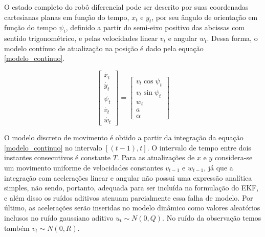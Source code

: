 \documentclass[a4paper,11pt]{article}
\begin{document}
O estado completo do robô diferencial pode ser descrito por suas coordenadas cartesianas planas em função do tempo, $x_t$ e $y_t$, por seu ângulo de orientação em função do tempo $\psi_t$, definido a partir do semi-eixo positivo das abcissas com sentido trigonométrico, e pelas velocidades linear $v_t$ e angular $w_t$. Dessa forma, o modelo contínuo de atualização na posição é dado pela equação \eqref{modelo_continuo}.

\begin{equation}
    \label{modelo_continuo}
    \begin{bmatrix} \dot{x_t} \\ \dot{y_t} \\ \dot{\psi_t} \\ \dot{v_t} \\ \dot{w_t}
    \end{bmatrix}
    =
    \begin{bmatrix} v_t \cos{\psi_t} \\ v_t \sin{\psi_t} \\ w_t \\ a \\ \alpha
    \end{bmatrix}
\end{equation}

O modelo discreto de movimento é obtido a partir da integração da equação \eqref{modelo_continuo} no intervalo $[(t-1),t]$. O intervalo de tempo entre dois instantes consecutivos é constante $T$. Para as atualizações de $x$ e $y$ considera-se um movimento uniforme de velocidades constantes $v_{t-1}$ e $w_{t-1}$, já que a integração com acelerações linear e angular não possui uma expressão analítica simples, não sendo, portanto, adequada para ser incluída na formulação do EKF, e além disso os ruídos aditivos atenuam parcialmente essa falha de modelo. Por último, as acelerações serão inseridas no modelo dinâmico como valores aleatórios inclusos no ruído gaussiano aditivo $u_t \sim N(0,Q)$. No ruído da observação temos também $v_t \sim N(0,R)$.
\end{document}
